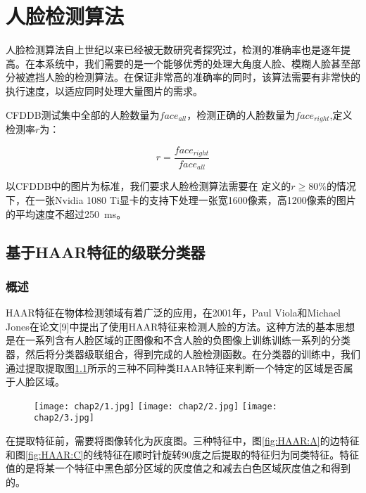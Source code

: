 \chapter{人脸检测算法}
\label{chap:facedetection}

人脸检测算法自上世纪以来已经被无数研究者探究过，检测的准确率也是逐年提高。在本系统中，我们需要的是一个能够优秀的处理大角度人脸、模糊人脸甚至部分被遮挡人脸的检测算法。在保证非常高的准确率的同时，该算法需要有非常快的执行速度，以适应同时处理大量图片的需求。

CFDDB测试集中全部的人脸数量为$face_{all}$，检测正确的人脸数量为$face_{right}$,定义检测率$r$为：

\begin{displaymath}
\label{eq:rdef}
	r = \frac{face_{right}}{face_{all}} 
\end{displaymath}

以CFDDB中的图片为标准，我们要求人脸检测算法需要在 定义的$r\geq 80\%$的情况下，在一张Nvidia 1080 Ti显卡的支持下处理一张宽1600像素，高1200像素的图片的平均速度不超过\SI{250}{ms}。


\section{基于HAAR特征的级联分类器}

\subsection{概述}
HAAR特征在物体检测领域有着广泛的应用，在2001年，Paul Viola和Michael Jones在论文[9]中提出了使用HAAR特征来检测人脸的方法。这种方法的基本思想是在一系列含有人脸区域的正图像和不含人脸的负图像上训练训练一系列的分类器，然后将分类器级联组合，得到完成的人脸检测函数。在分类器的训练中，我们通过提取提取图\ref{fig:HAAR}所示的三种不同种类HAAR特征来判断一个特定的区域是否属于人脸区域。

\begin{figure}[!htp]
	\centering
	{\texttt{[image: chap2/1.jpg]}}
	\hspace{4em}
	{\texttt{[image: chap2/2.jpg]}}
	\hspace{4em}
	{\texttt{[image: chap2/3.jpg]}}
	\label{fig:HAAR}
\end{figure}

在提取特征前，需要将图像转化为灰度图。三种特征中，图\ref{fig:HAAR:A}的边特征和图\ref{fig:HAAR:C}的线特征在顺时针旋转90度之后提取的特征归为同类特征。特征值的是将某一个特征中黑色部分区域的灰度值之和减去白色区域灰度值之和得到的。

